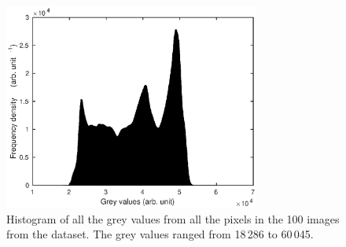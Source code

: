 \documentclass[12pt]{report}
\begin{document}
\begin{figure}[htp]
\centering
\includegraphics[width=0.75\textwidth]{figures/block_histogram.eps}
\caption{Histogram of all the grey values from all the pixels in the 100 images from the dataset. The grey values ranged from 18\,286 to 60\,045.}
\label{fig:block_histogram}
\end{figure}
\end{document}
